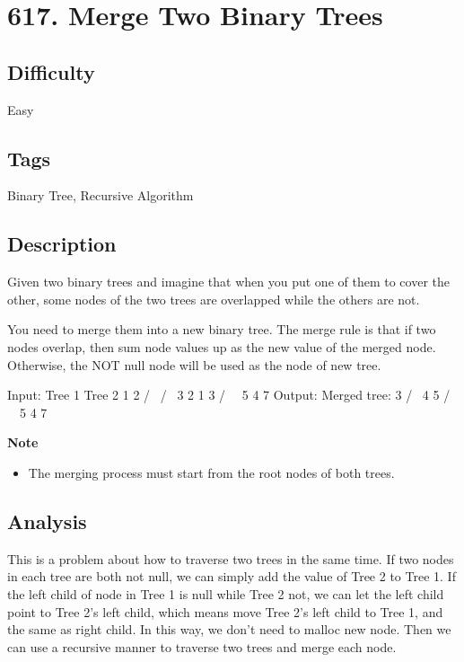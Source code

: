 \tocless\section{617. Merge Two Binary Trees}
\label{algo:617}

\subsection*{Difficulty}
Easy

\subsection*{Tags}
Binary Tree, Recursive Algorithm

\subsection*{Description}
Given two binary trees and imagine that when you put one of them to cover the other, some nodes of the two trees are overlapped while the others are not.

You need to merge them into a new binary tree. The merge rule is that if two nodes overlap, then sum node values up as the new value of the merged node. Otherwise, the NOT null node will be used as the node of new tree.

\begin{example}
\begin{multilinecode}
Input:
        Tree 1                    Tree 2
          1                         2
         / \                       / \
        3   2                     1   3
       /                           \   \
      5                             4   7
Output:
Merged tree:
         3
        / \
       4   5
      / \   \ 
     5   4   7
\end{multilinecode}
\end{example}

\textbf{Note}
\begin{itemize}
\item The merging process must start from the root nodes of both trees.
\end{itemize}

\subsection*{Analysis}
This is a problem about how to traverse two trees in the same time. If two nodes in each tree are both not null, we can simply add the value of Tree 2 to Tree 1. If the left child of node in Tree 1 is null while Tree 2 not, we can let the left child point to Tree 2's left child, which means move Tree 2's left child to Tree 1, and the same as right child. In this way, we don't need to malloc new node. Then we can use a recursive manner to traverse two trees and merge each node.

